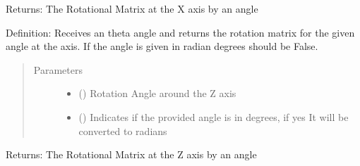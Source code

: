 \documentclass[letterpaper,10pt,english,openany,oneside]{sphinxmanual}
\begin{document}
\begin{fulllineitems}
\begin{fulllineitems}
\begin{quote}
\begin{description}
\begin{itemize}
\end{itemize}

\end{description}\end{quote}

Returns: The Rotational Matrix at the X axis by an  angle

\end{fulllineitems}


\begin{fulllineitems}
\label{\detokenize{MatrixManipulation:MatrixManipulation.Matrix.rot_y}}
Definition: Receives an theta angle and returns the rotation matrix for the given angle at the  axis.
If the angle is given in radian degrees should be False.
\begin{quote}\begin{description}
\item[{Parameters}] \leavevmode\begin{itemize}
\item {} 
 () \textendash{} Rotation Angle around the Z axis

\item {} 
 () \textendash{} Indicates if the provided angle is in degrees, if yes It will be converted to radians

\end{itemize}

\end{description}\end{quote}

Returns: The Rotational Matrix at the Z axis by an  angle

\end{fulllineitems}



\end{fulllineitems}
\end{document}
